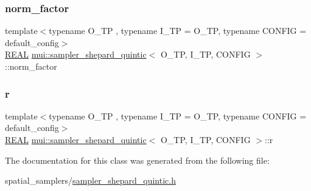 \subsubsection{\texorpdfstring{norm\+\_\+factor}{norm\_factor}}
{\footnotesize\ttfamily template$<$typename O\+\_\+\+TP , typename I\+\_\+\+TP  = O\+\_\+\+TP, typename C\+O\+N\+F\+IG  = default\+\_\+config$>$ \\
\hyperlink{classmui_1_1sampler__shepard__quintic_ae674072eac8556d3520cf5f6c1eb7ae6}{R\+E\+AL} \hyperlink{classmui_1_1sampler__shepard__quintic}{mui\+::sampler\+\_\+shepard\+\_\+quintic}$<$ O\+\_\+\+TP, I\+\_\+\+TP, C\+O\+N\+F\+IG $>$\+::norm\+\_\+factor\hspace{0.3cm}{\ttfamily [protected]}}

\mbox{\label{classmui_1_1sampler__shepard__quintic_a000dbbd67930c94b8a610470da33bc00}} 
\subsubsection{\texorpdfstring{r}{r}}
{\footnotesize\ttfamily template$<$typename O\+\_\+\+TP , typename I\+\_\+\+TP  = O\+\_\+\+TP, typename C\+O\+N\+F\+IG  = default\+\_\+config$>$ \\
\hyperlink{classmui_1_1sampler__shepard__quintic_ae674072eac8556d3520cf5f6c1eb7ae6}{R\+E\+AL} \hyperlink{classmui_1_1sampler__shepard__quintic}{mui\+::sampler\+\_\+shepard\+\_\+quintic}$<$ O\+\_\+\+TP, I\+\_\+\+TP, C\+O\+N\+F\+IG $>$\+::r\hspace{0.3cm}{\ttfamily [protected]}}



The documentation for this class was generated from the following file\+:\begin{DoxyCompactItemize}
\item 
spatial\+\_\+samplers/\hyperlink{sampler__shepard__quintic_8h}{sampler\+\_\+shepard\+\_\+quintic.\+h}\end{DoxyCompactItemize}
